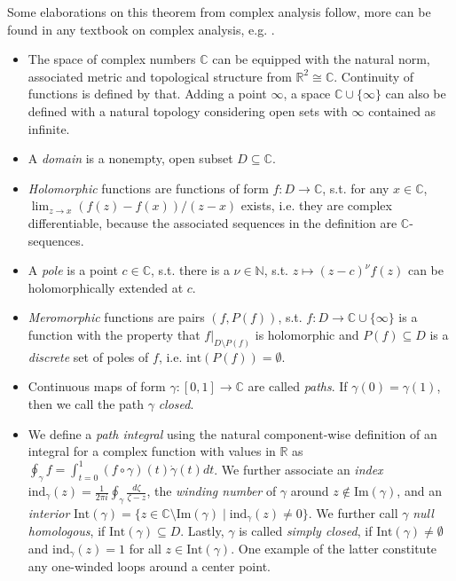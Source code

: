 \documentclass[10pt]{amsart}
\theoremstyle{definition}
\theoremstyle{remark}
\begin{document}
    Some elaborations on this theorem from complex analysis follow, more can be found in any textbook on complex analysis, e.g. \cite{Remmert}.
    \begin{itemize}[wide]
        \item The space of complex numbers \(\mathbb{C}\) can be equipped with the natural norm, associated metric and topological structure from \(\mathbb{R}^2 \cong \mathbb{C}\). Continuity of functions is defined by that. Adding a point \(\infty\), a space \(\mathbb{C} \cup \{\infty\}\) can also be defined with a natural topology considering open sets with \(\infty\) contained as infinite.
        \item A \emph{domain} is a nonempty, open subset \(D \subseteq \mathbb{C}\).
        \item \emph{Holomorphic} functions are functions of form \(f\colon D \to \mathbb{C}\), s.t. for any \(x \in \mathbb{C}\), \(\lim_{z \to x} (f(z)-f(x))/(z-x)\) exists, i.e. they are complex differentiable, because the associated sequences in the definition are \(\mathbb{C}\)-sequences.
        \item A \emph{pole} is a point \(c \in \mathbb{C}\), s.t. there is a \(\nu \in \mathbb{N}\), s.t. \(z \mapsto (z-c)^\nu f(z)\) can be holomorphically extended at \(c\).
        \item \emph{Meromorphic} functions are pairs \((f, P(f))\), s.t. \(f\colon D \to \mathbb{C} \cup \{\infty\}\) is a function with the property that \(f|_{D \setminus P(f)}\) is holomorphic and \(P(f) \subseteq D\) is a \emph{discrete} set of poles of \(f\), i.e. \(\text{int}(P(f)) = \emptyset\).
        \item Continuous maps of form \(\gamma\colon [0, 1] \to \mathbb{C}\) are called \emph{paths}. If \(\gamma(0) = \gamma(1)\), then we call the path \(\gamma\) \emph{closed}.
        \item We define a \emph{path integral} using the natural component-wise definition of an integral for a complex function with values in \(\mathbb{R}\) as \(\oint_\gamma f = \int_{t=0}^1 (f \circ \gamma)(t) \dot{\gamma}(t) dt\). We further associate an \emph{index} \(\text{ind}_{\gamma}(z) = \frac{1}{2 \pi i} \oint_\gamma \frac{d \zeta}{\zeta - z}\), the \emph{winding number} of \(\gamma\) around \(z \not\in \text{Im}(\gamma)\), and an \emph{interior} \(\text{Int}(\gamma) = \{z \in \mathbb{C} \setminus \text{Im}(\gamma) \mid \text{ind}_\gamma(z) \neq 0\}\). We further call \(\gamma\) \emph{null homologous}, if \(\text{Int}(\gamma) \subseteq D\). Lastly, \(\gamma\) is called \emph{simply closed}, if \(\text{Int}(\gamma) \neq \emptyset\) and \(\text{ind}_{\gamma}(z) = 1\) for all \(z \in \text{Int}(\gamma)\). One example of the latter constitute any one-winded loops around a center point.
    \end{itemize}
\end{document}
